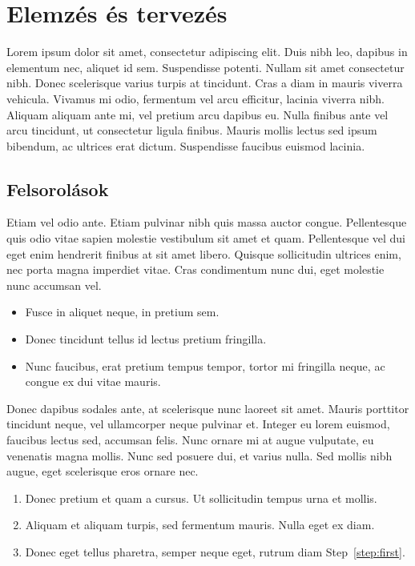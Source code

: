 \chapter{Elemzés és tervezés}
\label{ch:spec}

Lorem ipsum dolor sit amet, consectetur adipiscing elit. Duis nibh leo, dapibus in elementum nec, aliquet id sem. Suspendisse potenti. Nullam sit amet consectetur nibh. Donec scelerisque varius turpis at tincidunt. Cras a diam in mauris viverra vehicula. Vivamus mi odio, fermentum vel arcu efficitur, lacinia viverra nibh. Aliquam aliquam ante mi, vel pretium arcu dapibus eu. Nulla finibus ante vel arcu tincidunt, ut consectetur ligula finibus. Mauris mollis lectus sed ipsum bibendum, ac ultrices erat dictum. Suspendisse faucibus euismod lacinia.


\section{Felsorolások}

Etiam vel odio ante. Etiam pulvinar nibh quis massa auctor congue. Pellentesque quis odio vitae sapien molestie vestibulum sit amet et quam. Pellentesque vel dui eget enim hendrerit finibus at sit amet libero. Quisque sollicitudin ultrices enim, nec porta magna imperdiet vitae. Cras condimentum nunc dui, eget molestie nunc accumsan vel.

\begin{itemize}
	\item Fusce in aliquet neque, in pretium sem.
	\item Donec tincidunt tellus id lectus pretium fringilla.
	\item Nunc faucibus, erat pretium tempus tempor, tortor mi fringilla neque, ac congue ex dui vitae mauris.
\end{itemize}

Donec dapibus sodales ante, at scelerisque nunc laoreet sit amet. Mauris porttitor tincidunt neque, vel ullamcorper neque pulvinar et. Integer eu lorem euismod, faucibus lectus sed, accumsan felis. Nunc ornare mi at augue vulputate, eu venenatis magna mollis. Nunc sed posuere dui, et varius nulla. Sed mollis nibh augue, eget scelerisque eros ornare nec.

\begin{enumerate}
	\item\label{step:first} Donec pretium et quam a cursus. Ut sollicitudin tempus urna et mollis.
	\item Aliquam et aliquam turpis, sed fermentum mauris. Nulla eget ex diam.
	\item Donec eget tellus pharetra, semper neque eget, rutrum diam Step~\ref{step:first}.
\end{enumerate}

